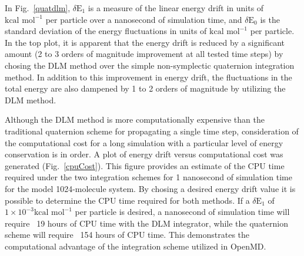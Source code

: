 \documentclass[letterpaper]{report}
\begin{document}
In Fig.~\ref{quatdlm}, $\delta \mbox{E}_1$ is a measure of the linear
energy drift in units of $\mbox{kcal mol}^{-1}$ per particle over a
nanosecond of simulation time, and $\delta \mbox{E}_0$ is the standard
deviation of the energy fluctuations in units of $\mbox{kcal
mol}^{-1}$ per particle. In the top plot, it is apparent that the
energy drift is reduced by a significant amount (2 to 3 orders of
magnitude improvement at all tested time steps) by chosing the DLM
method over the simple non-symplectic quaternion integration
method.  In addition to this improvement in energy drift, the
fluctuations in the total energy are also dampened by 1 to 2 orders of
magnitude by utilizing the DLM method.

Although the DLM method is more computationally expensive than
the traditional quaternion scheme for propagating a single time step,
consideration of the computational cost for a long simulation with a
particular level of energy conservation is in order.  A plot of energy
drift versus computational cost was generated
(Fig.~\ref{cpuCost}). This figure provides an estimate of the CPU time
required under the two integration schemes for 1 nanosecond of
simulation time for the model 1024-molecule system.  By chosing a
desired energy drift value it is possible to determine the CPU time
required for both methods. If a $\delta \mbox{E}_1$ of $1 \times
10^{-3} \mbox{kcal mol}^{-1}$ per particle is desired, a nanosecond of
simulation time will require ~19 hours of CPU time with the DLM
integrator, while the quaternion scheme will require ~154 hours of CPU
time. This demonstrates the computational advantage of the integration
scheme utilized in OpenMD.
\end{document}
